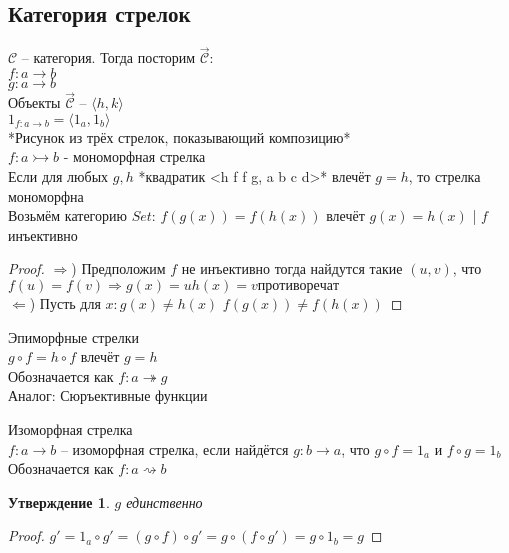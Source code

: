 \documentclass[a4paper, fleqn, draft]{report}
\newtheorem*{stmt}{Утверждение}
\begin{document}
\subsection{Категория стрелок}
$\mathcal{C}$ -- категория. Тогда посторим $\overrightarrow{\mathcal{C}}$: \\
$f\colon a \to b$ \\
$g\colon a \to b$ \\

Объекты $\overrightarrow{\mathcal{C}}$ -- $\langle h, k \rangle$ \\
$1_{f\colon a \to b} = \langle 1_a, 1_b \rangle$ \\

*Рисунок из трёх стрелок, показывающий композицию* \\

$f\colon a \rightarrowtail b$ - мономорфная стрелка \\
Если для любых $g, h$ *квадратик <h f f g, a b c d>* влечёт $g = h$, то стрелка
мономорфна \\

Возьмём категорию $Set$: $f(g(x)) = f(h(x))$ влечёт $g(x)=h(x)$ | $f$ инъективно
\begin{proof}
  $\Rightarrow$) Предположим $f$ не инъективно тогда найдутся такие $(u, v)$, что $f(u) = f(v)
  \Rightarrow g(x) = u h(x) = v противоречат$ \\
  $\Leftarrow$) Пусть для $x: g(x) \ne h(x)$ $f(g(x)) \ne f(h(x))$
\end{proof}

Эпиморфные стрелки \\
$g \circ f = h \circ f$ влечёт $g = h$ \\
Обозначается как $f\colon a \twoheadrightarrow g$ \\
Аналог: Сюръективные функции

Изоморфная стрелка \\
$f\colon a \to b$ -- изоморфная стрелка, если найдётся $g\colon b \to a$, что
$g \circ f = 1_a$ и $f \circ g = 1_b$ \\
Обозначается как $f\colon a \rightsquigarrow b$ \\
\begin{stmt}
  $g$ единственно
\end{stmt}
\begin{proof}
  $g' = 1_a \circ g' = (g \circ f) \circ g' = g \circ (f \circ g') = g \circ 1_b = g$
\end{proof}
\end{document}
